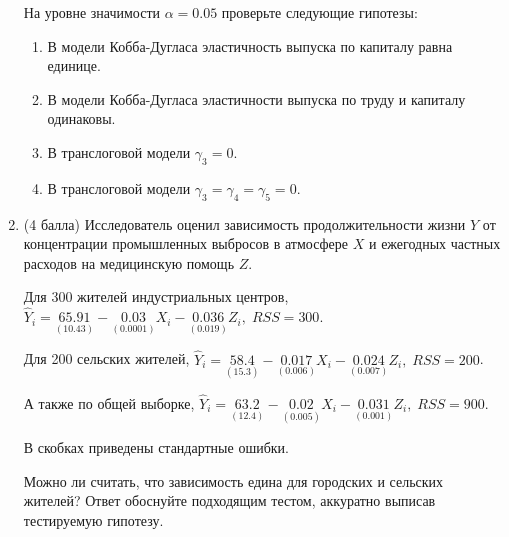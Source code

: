 \documentclass[12pt]{article}
\theoremstyle{definition}
\begin{document}
\begin{enumerate}

На уровне значимости $\alpha = 0.05$ проверьте следующие гипотезы:
\begin{enumerate}
\item В модели Кобба-Дугласа эластичность выпуска по капиталу равна единице.
\item В модели Кобба-Дугласа эластичности выпуска по труду и капиталу одинаковы.
\item В транслоговой модели $\gamma_3=0$.
\item В транслоговой модели $\gamma_3 = \gamma_4 = \gamma_5 = 0$.
\end{enumerate}

\newpage
\item
(4 балла)
Исследователь оценил зависимость продолжительности жизни $Y$ от концентрации  промышленных выбросов в атмосфере $X$ и ежегодных частных расходов на медицинскую помощь $Z$.

Для 300 жителей индустриальных центров, $\hat{Y}_i = \underset{(10.43)}{65.91} - \underset{(0.0001)}{0.03}X_i - \underset{(0.019)}{0.036}Z_i, \; RSS = 300$.

Для 200 сельских жителей, $\hat{Y}_i = \underset{(15.3)}{58.4} - \underset{(0.006)}{0.017}X_i - \underset{(0.007)}{0.024}Z_i, \; RSS = 200$.

А также по общей выборке, $\hat{Y}_i = \underset{(12.4)}{63.2} - \underset{(0.005)}{0.02}X_i - \underset{(0.001)}{0.031}Z_i, \; RSS = 900$.

В скобках приведены стандартные ошибки.

Можно ли считать, что зависимость едина для городских и сельских жителей?
Ответ обоснуйте подходящим тестом, аккуратно выписав тестируемую гипотезу.
\newpage


\end{enumerate}
\end{document}
